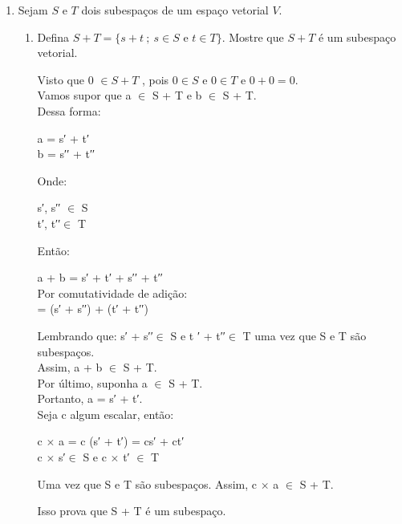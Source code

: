 \documentclass[leqno]{article}
\numberwithin{equation}{section}
\begin{document}
	\begin{enumerate}
		
		\item Sejam $S$ e $T$ dois subespaços de um espaço vetorial $V$.
		
		\begin{enumerate}
			
			\item Defina $S + T = \{s + t \ ; \ s \in S \mbox{ e } t \in T\}$. Mostre que $S + T$ é um subespaço vetorial.
			
			\begin{sol} 
				\newline					
				Visto que 0 $\in S + T$ , pois $0 \in S$ e $0 \in T$ e $0 + 0 = 0$.\\
				Vamos supor que a $\in$ S + T e b $\in$ S + T.\\
				Dessa forma: 
				\begin{center}
				a = s′ + t′\\
				b = s′′ + t′′\\
				\end{center} 
				Onde: 
				\begin{center}
				s′, s′′ $\in$ S\\
				t′, t′′$\in$ T\\
				\end{center}
				Então:
				\begin{center}
				a + b = s′ + t′ + s′′ + t′′\\
				Por comutatividade de adição:\\
				= (s′ + s′′) + (t′ + t′′)\\
				\end{center} 
				Lembrando que: s′ + s′′$\in$ S e t ′ + t′′$\in$ T uma vez que S e T são subespaços.\\
				Assim, a + b $\in$ S + T.\\
				
				Por último, suponha a $\in$ S + T.\\
				Portanto, a = s′ + t′.\\
				Seja c algum escalar, então:
				\begin{center}
				c $\times$ a = c (s′ + t′) = cs′ + ct′\\ 
				c $\times$ s′$\in$ S e c $\times$ t′ $\in$ T
				\end{center}
				Uma vez que S e T são subespaços. Assim, c $\times$ a $\in$ S + T.
				
				Isso prova que S + T é um subespaço.
				\newline
			\end{sol} 
			

\end{enumerate}
\end{enumerate}
\end{document}
